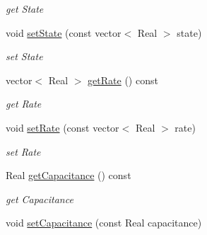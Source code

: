 \begin{DoxyCompactItemize}
\begin{DoxyCompactList}\small\item\em get State \item\end{DoxyCompactList}\item 
\hypertarget{classvoom_1_1_ionic_material_a1a8768ce529dcb907cd2fcb61b8a8078}{
void \hyperlink{classvoom_1_1_ionic_material_a1a8768ce529dcb907cd2fcb61b8a8078}{setState} (const vector$<$ Real $>$ state)}
\label{classvoom_1_1_ionic_material_a1a8768ce529dcb907cd2fcb61b8a8078}

\begin{DoxyCompactList}\small\item\em set State \item\end{DoxyCompactList}\item 
\hypertarget{classvoom_1_1_ionic_material_a013f9c225de7f6d8f063eaf520ac6026}{
vector$<$ Real $>$ \hyperlink{classvoom_1_1_ionic_material_a013f9c225de7f6d8f063eaf520ac6026}{getRate} () const }
\label{classvoom_1_1_ionic_material_a013f9c225de7f6d8f063eaf520ac6026}

\begin{DoxyCompactList}\small\item\em get Rate \item\end{DoxyCompactList}\item 
\hypertarget{classvoom_1_1_ionic_material_a604eb2e996c55355a0a421ecdf2a0ffc}{
void \hyperlink{classvoom_1_1_ionic_material_a604eb2e996c55355a0a421ecdf2a0ffc}{setRate} (const vector$<$ Real $>$ rate)}
\label{classvoom_1_1_ionic_material_a604eb2e996c55355a0a421ecdf2a0ffc}

\begin{DoxyCompactList}\small\item\em set Rate \item\end{DoxyCompactList}\item 
\hypertarget{classvoom_1_1_ionic_material_a0984247d72470a91dd6813cbadd9e9b9}{
Real \hyperlink{classvoom_1_1_ionic_material_a0984247d72470a91dd6813cbadd9e9b9}{getCapacitance} () const }
\label{classvoom_1_1_ionic_material_a0984247d72470a91dd6813cbadd9e9b9}

\begin{DoxyCompactList}\small\item\em get Capacitance \item\end{DoxyCompactList}\item 
\hypertarget{classvoom_1_1_ionic_material_ab3916e8bef510385d019873d6c40b74c}{
void \hyperlink{classvoom_1_1_ionic_material_ab3916e8bef510385d019873d6c40b74c}{setCapacitance} (const Real capacitance)}
\label{classvoom_1_1_ionic_material_ab3916e8bef510385d019873d6c40b74c}


\end{DoxyCompactItemize}
